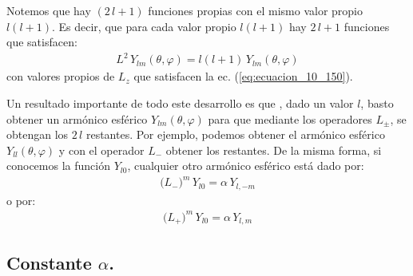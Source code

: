 Notemos que hay $(2 \, l + 1)$ funciones propias con el mismo valor propio $l (l + 1)$. Es decir, que para cada valor propio $l (l + 1)$ hay $2 \, l + 1$ funciones que satisfacen:
\begin{align*}
L^{2} \, Y_{l m} (\theta, \varphi) = l (l + 1)\, Y_{l m} (\theta, \varphi)
\label{eq:ecuacion_10_151}
\end{align*}
con valores propios de $L_{z}$ que satisfacen la ec. (\ref{eq:ecuacion_10_150}).
\par
Un resultado importante de todo este desarrollo es que , dado un valor $l$, basto obtener un armónico esférico $Y_{lm} (\theta, \varphi)$ para que mediante los operadores $L_{\pm}$, se obtengan los $2 \, l$ restantes. Por ejemplo, podemos obtener el armónico esférico $Y_{l l} (\theta, \varphi)$ y con el operador $L_{-}$ obtener los restantes. De la misma forma, si conocemos la función $Y_{l 0}$, cualquier otro armónico esférico está dado por:
\begin{align}
\big( L_{-} \big)^{m} \, Y_{l 0} = \alpha \, Y_{l, -m}
\end{align}
o por:
\begin{align}
\big( L_{+} \big)^{m} \, Y_{l 0} = \alpha \, Y_{l, m}
\end{align}

\subsection{Constante \texorpdfstring{$\alpha$}{a}.}

